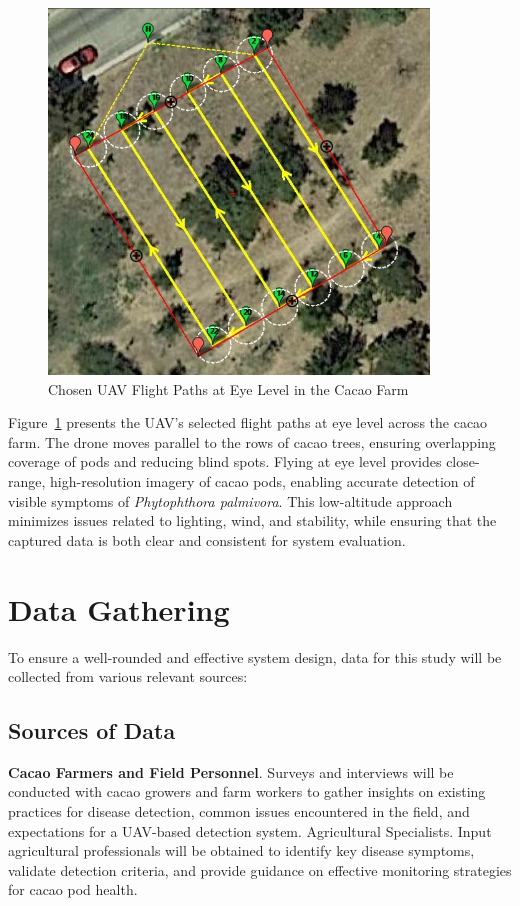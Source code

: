 \begin{figure}[H]
	\centering
	\caption{Chosen UAV Flight Paths at Eye Level in the Cacao Farm}
	\label{fig:uav_flight_paths}
	\includegraphics[width=0.9\textwidth]{figures/Uav_Flight_Paths.png}
\end{figure}

Figure~\ref{fig:uav_flight_paths} presents the UAV’s selected flight paths at eye level across the cacao farm. 
The drone moves parallel to the rows of cacao trees, ensuring overlapping coverage of pods and reducing blind spots. 
Flying at eye level provides close-range, high-resolution imagery of cacao pods, enabling accurate detection of visible symptoms of \textit{Phytophthora palmivora}. 
This low-altitude approach minimizes issues related to lighting, wind, and stability, while ensuring that the captured data is both clear and consistent for system evaluation.


\section{Data Gathering}
To ensure a well-rounded and effective system design, data for this study will be collected from various relevant sources:
\subsection{Sources of Data}
\textbf{Cacao Farmers and Field Personnel}. Surveys and interviews will be conducted with cacao growers and farm workers to gather insights on existing practices for disease detection, common issues encountered in the field, and expectations for a UAV-based detection system. Agricultural Specialists. Input agricultural professionals will be obtained to identify key disease symptoms, validate detection criteria, and provide guidance on effective monitoring strategies for cacao pod health.

